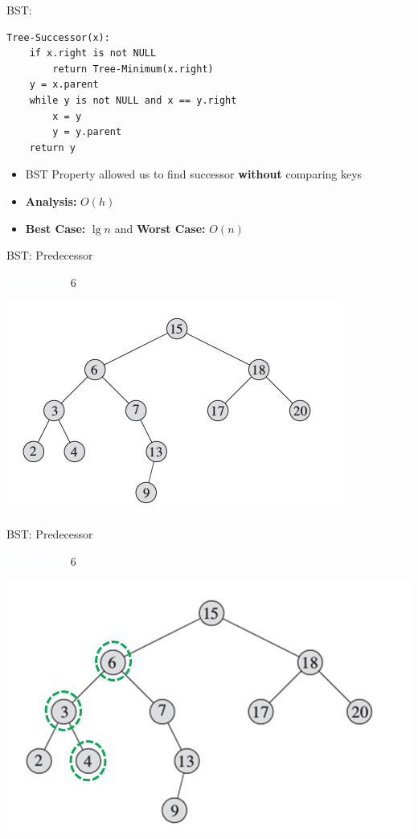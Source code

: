 \documentclass{beamer}
\newcommand{\tblue}[1]{{\Large {\textcolor{azure}{#1}}}}
\begin{document}
\begin{frame}[fragile]{BST: }
\begin{verbatim}
Tree-Successor(x):
    if x.right is not NULL
        return Tree-Minimum(x.right)
    y = x.parent
    while y is not NULL and x == y.right
        x = y
        y = y.parent
    return y
\end{verbatim}
    \begin{itemize}
        \item BST Property allowed us to find successor {\bf without} comparing keys
        \item {\bf Analysis:} $O(h)$ 
        \item {\bf Best Case:} $\lg n$ and {\bf Worst Case:} $O(n)$
    \end{itemize}
\end{frame}



\begin{frame}{BST: Predecessor}

\tblue{Predecessor:} $6$
    \begin{center}
        \includegraphics[scale=0.5]{bstSearch.png}
    \end{center}
\end{frame}


\begin{frame}{BST: Predecessor}

\tblue{Predecessor:} $6$
    \begin{center}
        \includegraphics[scale=0.5]{bstPredecessor2.png}
    \end{center}
\end{frame}
\end{document}
